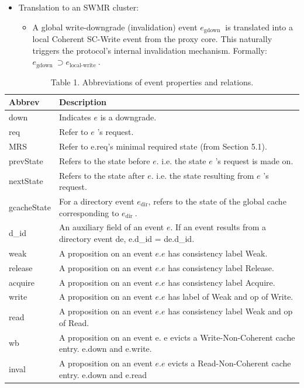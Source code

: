 \documentclass[10pt]{article}
\begin{document}
\begin{itemize}
  \item[-] Translation to an SWMR cluster:
  \begin{itemize}
    \item[-] A global write-downgrade (invalidation) event $e_{\text {gdown }}$ is translated into a local Coherent SC-Write event from the proxy core. This naturally triggers the protocol's internal invalidation mechanism. Formally: $e_{\text {gdown }} \supset e_{\text {local-write }}$.
  \end{itemize}
\end{itemize}

\begin{table}[h]
\begin{center}
\captionsetup{labelformat=empty}
\caption{Table 1. Abbreviations of event properties and relations.}
\begin{tabular}[t]{|l|l|}
\hline
Abbrev & Description \\
\hline
down & Indicates $e$ is a downgrade. \\
\hline
req & Refer to $e$ 's request. \\
\hline
MRS & Refer to e.req's minimal required state (from Section 5.1). \\
\hline
prevState & Refers to the state before $e$. i.e. the state $e$ 's request is made on. \\
\hline
nextState & Refers to the state after $e$. i.e. the state resulting from $e$ 's request. \\
\hline
gcacheState & For a directory event $e_{\mathrm{dir}}$, refers to the state of the global cache corresponding to $e_{\text {dir }}$. \\
\hline
d\_id & An auxiliary field of an event $e$. If an event results from a directory event de, e.d\_id = de.d\_id. \\
\hline
weak & A proposition on an event $e . e$ has consistency label Weak. \\
\hline
release & A proposition on an event $e . e$ has consistency label Release. \\
\hline
acquire & A proposition on an event $e . e$ has consistency label Acquire. \\
\hline
write & A proposition on an event $e . e$ has label of Weak and op of Write. \\
\hline
read & A proposition on an event $e . e$ has consistency label Weak and op of Read. \\
\hline
wb & A proposition on an event e. e evicts a Write-Non-Coherent cache entry. e.down and e.write. \\
\hline
inval & A proposition on an event $e . e$ evicts a Read-Non-Coherent cache entry. e.down and e.read \\
\hline
\end{tabular}
\end{center}
\end{table}
\end{document}
